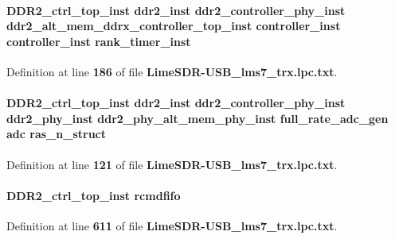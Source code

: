 \paragraph[{rank\+\_\+timer\+\_\+inst}]{ {\bf D\+D\+R2\+\_\+ctrl\+\_\+top\+\_\+inst} {\bf ddr2\+\_\+inst} {\bf ddr2\+\_\+controller\+\_\+phy\+\_\+inst} {\bf ddr2\+\_\+alt\+\_\+mem\+\_\+ddrx\+\_\+controller\+\_\+top\+\_\+inst} {\bf controller\+\_\+inst} {\bf controller\+\_\+inst} rank\+\_\+timer\+\_\+inst}\label{LimeSDR-USB__lms7__trx_8lpc_8txt_ad1812f18742d9ebb99c0440a1aa9ff1a}


Definition at line {\bf 186} of file {\bf Lime\+S\+D\+R-\/\+U\+S\+B\+\_\+lms7\+\_\+trx.\+lpc.\+txt}.

\paragraph[{ras\+\_\+n\+\_\+struct}]{ {\bf D\+D\+R2\+\_\+ctrl\+\_\+top\+\_\+inst} {\bf ddr2\+\_\+inst} {\bf ddr2\+\_\+controller\+\_\+phy\+\_\+inst} {\bf ddr2\+\_\+phy\+\_\+inst} {\bf ddr2\+\_\+phy\+\_\+alt\+\_\+mem\+\_\+phy\+\_\+inst} full\+\_\+rate\+\_\+adc\+\_\+gen {\bf adc} ras\+\_\+n\+\_\+struct}\label{LimeSDR-USB__lms7__trx_8lpc_8txt_a83b99c172e0c0c6ee4761580f34067bb}


Definition at line {\bf 121} of file {\bf Lime\+S\+D\+R-\/\+U\+S\+B\+\_\+lms7\+\_\+trx.\+lpc.\+txt}.

\paragraph[{rcmdfifo}]{ {\bf D\+D\+R2\+\_\+ctrl\+\_\+top\+\_\+inst} rcmdfifo}\label{LimeSDR-USB__lms7__trx_8lpc_8txt_a6e6b42aad6ff63788f14ef417987b9c4}


Definition at line {\bf 611} of file {\bf Lime\+S\+D\+R-\/\+U\+S\+B\+\_\+lms7\+\_\+trx.\+lpc.\+txt}.

